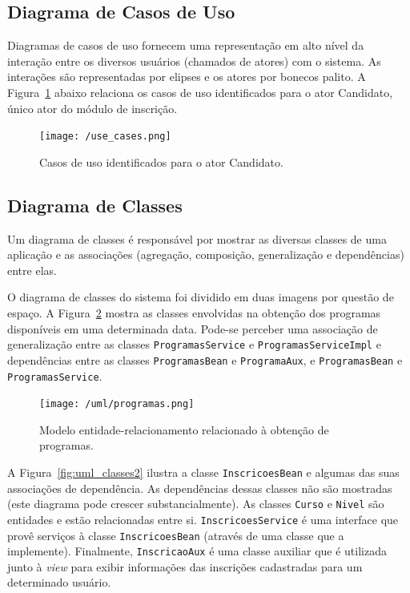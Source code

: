 \documentclass[
  10.5pt,				  %
	openright,			%
	twoside,			  %
  a5paper,
  chapter=TITLE,	%
	section=TITLE,	%
  hyphens,        %
	english,        %
	brazil          %
]{abntex2}
\begin{document}
\subsection{Diagrama de Casos de Uso}

Diagramas de casos de uso fornecem uma representação em alto nível da interação entre os diversos usuários (chamados de atores) com o sistema. As interações são representadas por elipses e os atores por bonecos palito. A Figura~\ref{fig:use_cases} abaixo relaciona os casos de uso identificados para o ator Candidato, único ator do módulo de inscrição.

\begin{figure}[!ht]
  \caption{\label{fig:use_cases} Casos de uso identificados para o ator Candidato. }
  \begin{center}
    \texttt{[image: /use\_cases.png]}
  \end{center}
\end{figure}

\subsection{Diagrama de Classes}

Um diagrama de classes é responsável por mostrar as diversas classes de uma aplicação e as associações (agregação, composição, generalização e dependências) entre elas.

O diagrama de classes do sistema foi dividido em duas imagens por questão de espaço. A Figura~\ref{fig:uml_classes1} mostra as classes envolvidas na obtenção dos programas disponíveis em uma determinada data. Pode-se perceber uma associação de generalização entre as classes \texttt{ProgramasService} e \texttt{ProgramasServiceImpl} e dependências entre as classes \texttt{ProgramasBean} e \texttt{ProgramaAux}, e \texttt{ProgramasBean} e \texttt{ProgramasService}.

\begin{figure}[!ht]
  \caption{\label{fig:uml_classes1} Modelo entidade-relacionamento relacionado à obtenção de programas. }
  \begin{center}
    \texttt{[image: /uml/programas.png]}
  \end{center}
\end{figure}

A Figura~\ref{fig:uml_classes2} ilustra a classe \texttt{InscricoesBean} e algumas das suas associações de dependência. As dependências dessas classes não são mostradas (este diagrama pode crescer substancialmente). As classes \texttt{Curso} e \texttt{Nivel} são entidades e estão relacionadas entre si. \texttt{InscricoesService} é uma interface que provê serviços à classe \texttt{InscricoesBean} (através de uma classe que a implemente). Finalmente, \texttt{InscricaoAux} é uma classe auxiliar que é utilizada junto à \emph{view} para exibir informações das inscrições cadastradas para um determinado usuário.
\end{document}
